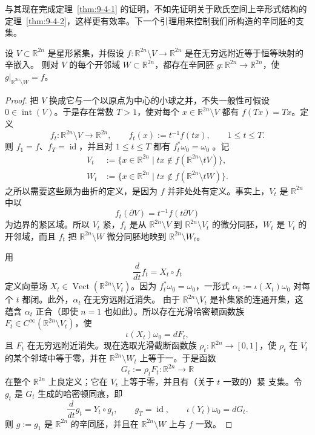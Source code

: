 与其现在完成定理~\ref{thm:9-4-1} 的证明，不如先证明关于欧氏空间上辛形式结构的
定理~\ref{thm:9-4-2}，这样更有效率。下一个引理用来控制我们所构造的辛同胚的支集。

\begin{lemma}\label{lem:9-4-10}
设 $V\subset\mathbb R^{2n}$ 是星形紧集，并假设
$f:\mathbb R^{2n}\setminus V\to\mathbb R^{2n}$ 是在无穷远附近等于恒等映射的辛嵌入。
则对 $V$ 的每个开邻域 $W\subset\mathbb R^{2n}$，都存在辛同胚
$g:\mathbb R^{2n}\to\mathbb R^{2n}$，使
$g|_{\mathbb R^{2n}\setminus W}=f$。
\end{lemma}

\begin{proof}
把 $V$ 换成它与一个以原点为中心的小球之并，不失一般性可假设
$0\in\operatorname{int}(V)$。于是存在常数 $T>1$，使对每个
$x\in\mathbb R^{2n}\setminus V$ 都有 $f(Tx)=Tx$。定义
\[
  f_t:\mathbb R^{2n}\setminus V\longrightarrow\mathbb R^{2n},
  \qquad
  f_t(x):=t^{-1}f(tx),
  \qquad1\le t\le T.
\]
则 $f_1=f$、$f_T=\operatorname{id}$，并且对 $1\le t\le T$ 都有
$f_t^*\omega_0=\omega_0$
。记
\[
\begin{split}
  V_t&:=\bigl\{x\in\mathbb R^{2n}\mid
    tx\notin f(\mathbb R^{2n}\setminus tV)\bigr\},\\
  W_t&:=\bigl\{x\in\mathbb R^{2n}\mid
    tx\notin f(\mathbb R^{2n}\setminus tW)\bigr\}.
\end{split}
\]
之所以需要这些颇为曲折的定义，是因为 $f$ 并非处处有定义。事实上，$V_t$ 是
$\mathbb R^{2n}$ 中以
\[
  f_t(\partial V)=t^{-1}f(t\partial V)
\]
为边界的紧区域。所以 $V_t$ 紧，$f_t$ 是从
$\mathbb R^{2n}\setminus V$ 到 $\mathbb R^{2n}\setminus V_t$ 的微分同胚，$W_t$ 是
$V_t$ 的开邻域，而且 $f_t$ 把 $\mathbb R^{2n}\setminus W$ 微分同胚地映到
$\mathbb R^{2n}\setminus W_t$。

用
\[
  \frac d{dt}f_t=X_t\circ f_t
\]
定义向量场
$X_t\in\operatorname{Vect}(\mathbb R^{2n}\setminus V_t)$。因为
$f_t^*\omega_0=\omega_0$，一形式
$\alpha_t:=\iota(X_t)\omega_0$ 对每个 $t$ 都闭。此外，$\alpha_t$ 在无穷远附近消失。
由于 $\mathbb R^{2n}\setminus V_t$ 是补集紧的连通开集，这蕴含 $\alpha_t$ 正合（即使
$n=1$ 也如此）。所以存在光滑哈密顿函数族
$F_t\in C^\infty(\mathbb R^{2n}\setminus V_t)$，使
\[
  \iota(X_t)\omega_0=dF_t,
\]
且 $F_t$ 在无穷远附近消失。现在选取光滑截断函数族
$\rho_t:\mathbb R^{2n}\to[0,1]$，使 $\rho_t$ 在 $V_t$ 的某个邻域中等于零，并在
$\mathbb R^{2n}\setminus W_t$ 上等于一。于是函数
\[
  G_t:=\rho_tF_t:\mathbb R^{2n}\longrightarrow\mathbb R
\]
在整个 $\mathbb R^{2n}$ 上良定义；它在 $V_t$ 上等于零，并且有（关于 $t$ 一致的）紧
支集。令 $g_t$ 是 $G_t$ 生成的哈密顿同痕，即
\[
  \frac d{dt}g_t=Y_t\circ g_t,
  \qquad
  g_T=\operatorname{id},
  \qquad
  \iota(Y_t)\omega_0=dG_t.
\]
则 $g:=g_1$ 是 $\mathbb R^{2n}$ 的辛同胚，并且在
$\mathbb R^{2n}\setminus W$ 上与 $f$ 一致。
\end{proof}

